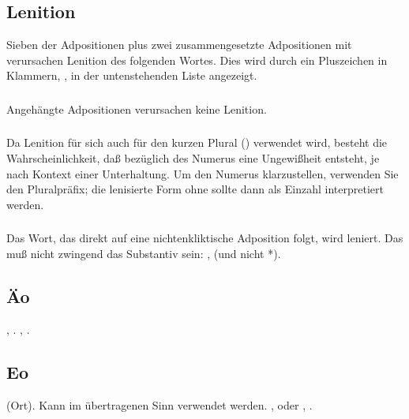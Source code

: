 \subsection{Lenition} Sieben der Adpositionen plus zwei zusammengesetzte
Adpositionen mit  verursachen Lenition des folgenden Wortes. Dies wird durch ein
Pluszeichen in Klammern, \N{(+)}, in der untenstehenden Liste angezeigt.

\subsubsection{} Angeh\"angte Adpositionen verursachen keine Lenition.

\subsubsection{} Da Lenition f\"ur sich auch f\"ur den kurzen Plural
() verwendet wird, besteht die Wahrscheinlichkeit, da\ss{}
bez\"uglich des Numerus eine Ungewi\ss{}heit entsteht, je nach Kontext einer Unterhaltung.
Um den Numerus klarzustellen, verwenden Sie den Pluralpr\"afix; die lenisierte Form ohne
 sollte dann als Einzahl interpretiert werden.
\label{syn:adp:short-plural}

\subsubsection{} Das Wort, das direkt auf eine nichtenkliktische Adposition folgt,
wird leniert. Das mu\ss{} nicht zwingend das Substantiv sein: ,
 (und nicht *).

\subsection{\"Ao}, . , .
\label{syn:adp:äo}

\subsection{Eo}  (Ort). Kann im \"ubertragenen Sinn verwendet werden.
,  oder
, .
\label{syn:adp:eo}

